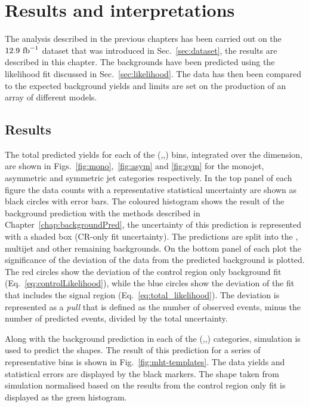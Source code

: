 \chapter{Results and interpretations}
\label{chap:results}

The analysis described in the previous chapters has been carried out
on the $12.9~\text{fb}^{-1}$ dataset that was introduced in
Sec.~\ref{sec:dataset}, the results are described in this chapter. The
\SM backgrounds have been predicted using the likelihood fit discussed
in Sec.~\ref{sec:likelihood}. The data has then been compared to the expected
background yields and limits are set on the production of an array of
different \SUSY models.

\section{Results}

The total predicted \SM yields for each of the (\HT,\nj,\nb) bins,
integrated over the \MHT dimension, are shown in
Figs.~\ref{fig:mono},~\ref{fig:asym} and \ref{fig:sym} for the
monojet, asymmetric and symmetric jet categories respectively. In the
top panel of each figure the data counts with a representative
statistical uncertainty are shown as black circles with error bars.
The coloured histogram shows the result of the \SM background
prediction with the \TF methods described in
Chapter~\ref{chap:backgroundPred}, the uncertainty of this prediction
is represented with a shaded box (CR-only fit uncertainty). The
predictions are split into the \znunu, \QCD multijet and other
remaining \SM backgrounds. On the bottom panel of each plot the
significance of the deviation of the data from the predicted \SM
background is plotted. The red circles show the deviation of the
control region only background fit (Eq.~\ref{eq:controlLikelihood}),
while the blue circles show the deviation of the fit that includes the
signal region (Eq.~\ref{eq:total_likelihood}). The deviation is
represented as a \emph{pull} that is defined as the number of observed
events, minus the number of predicted events, divided by the total
uncertainty.

Along with the background prediction in each of the (\HT,\nj,\nb)
categories, simulation is used to predict the \MHT shapes. The result
of this prediction for a series of representative bins is shown in
Fig.~\ref{fig:mht-templates}. The data yields and statistical errors
are displayed by the black markers. The \MHT shape taken from
simulation normalised based on the results from the control region
only fit is displayed as the green histogram.

